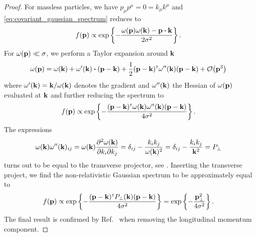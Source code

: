 \begin{proof}
	For massless particles, we have $p_\mu p^\mu=0=k_\mu k^\mu$ and \cref{eq:covariant_gaussian_spectrum} reduces to
	\begin{equation*}
		f(\vb{p})
		\propto
		\exp\left\{
			-
			\frac{\omega(\vb{p})\omega(\vb{k})-\vb{p}\vdot\vb{k}}{2\sigma^2}
		\right\}
		.
	\end{equation*}
	For $\omega(\vb{p})\ll\sigma$, we perform a Taylor expansion around $\vb{k}$
	\begin{equation*}
		\omega(\vb{p})
		=
		\omega(\vb{k})
		+
		\omega^\prime(\vb{k})
		\vdot
		(\vb{p}-\vb{k})
		+
		\frac{1}{2}
		(\vb{p}-\vb{k})^\trans
		\omega^{\prime\prime}(\vb{k})
		(\vb{p}-\vb{k})
		+
		\order{\vb{p}^3}
	\end{equation*}
	where $\omega^\prime(\vb{k})=\vb{k}/\omega(\vb{k})$ denotes the gradient and $\omega^{\prime\prime}(\vb{k})$ the Hessian of $\omega(\vb{p})$ evaluated at $\vb{k}$ and further reducing the spectrum to
	\begin{equation*}
		f(\vb{p})
		\propto
		\exp\left\{
			-
			\frac{
				(\vb{p}-\vb{k})^{\scriptscriptstyle\mathsf{T}}
				\omega(\vb{k})
				\omega^{\prime\prime}(\vb{k})
				(\vb{p}-\vb{k})
			}{4\sigma^2}
		\right\}
		.
	\end{equation*}
	The expressions
	\begin{equation*}
		\omega(\vb{k})
		\omega^{\prime\prime}(\vb{k})_{ij}
		=
		\omega(\vb{k})
		\pdv{\omega(\vb{k})}{k_i}{k_j}
		=
		\delta_{ij}
		-
		\frac{k_ik_j}{\omega(\vb{k})^2}
		=
		\delta_{ij}
		-
		\frac{k_ik_j}{\vb{k}^2}
		=
		P_\perp
	\end{equation*}
	turns out to be equal to the transverse projector, see .
	Inserting the transverse project, we find the non-relativistic Gaussian spectrum to be approximately equal to
	\begin{equation*}
		f(\vb{p})
		\propto
		\exp\left\{
			-
			\frac{
				(\vb{p}-\vb{k})^{\scriptscriptstyle\mathsf{T}}
				P_\perp(\vb{k})
				(\vb{p}-\vb{k})
			}{4\sigma^2}
		\right\}
		=
		\exp\left\{
			-
			\frac{
				\vb{p}_\perp^2
			}{4\sigma^2}
		\right\}
		.
	\end{equation*}
	The final result is confirmed by Ref.~\cite[eq.~(25)]{Naumov2013} when removing the longitudinal momentum component.
\end{proof}

